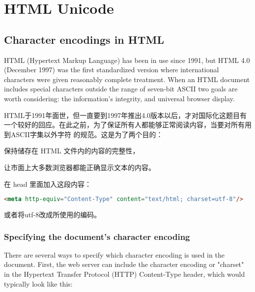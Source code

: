 \part{HTML Unicode}






\chapter{Character encodings in HTML}




HTML (Hypertext Markup Language) has been in use since 1991, but HTML 4.0 (December 1997) was the first standardized version where international characters were given reasonably complete treatment. When an HTML document includes special characters outside the range of seven-bit ASCII two goals are worth considering: the information's integrity, and universal browser display.

HTML于1991年面世，但一直要到1997年推出4.0版本以后，才对国际化这题目有一个较好的回应。在此之前，为了保证所有人都能够正常阅读内容，当要对所有用到ASCII字集以外字符 的规范。这是为了两个目的：

\begin{compactitem}
\item 保持储存在 HTML 文件内的内容的完整性，
\item 让市面上大多数浏览器都能正确显示文本的内容。
\end{compactitem}

在 head 里面加入这段内容：

\begin{lstlisting}[language=HTML]
<meta http-equiv="Content-Type" content="text/html; charset=utf-8"/>
\end{lstlisting}

或者将utf-8改成所使用的编码\cite{character_encoding}。





\section{Specifying the document's character encoding}


There are several ways to specify which character encoding is used in the document. First, the web server can include the character encoding or "charset" in the Hypertext Transfer Protocol (HTTP) Content-Type header, which would typically look like this:

